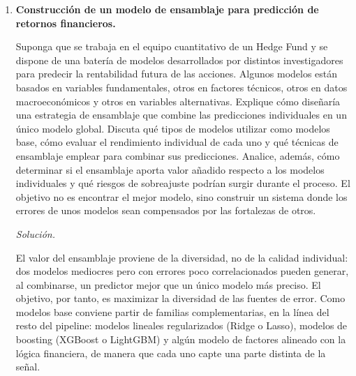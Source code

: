 \documentclass[12pt]{article}
\newcommand\sol[1]{\begin{mdframed}
\emph{Solución.} #1
\end{mdframed}}
\begin{document}
\begin{enumerate}
{\medskip
En cambio, construir variables a mano aporta poco cuando el propio modelo ya es capaz de extraer esa
información. Con imágenes, texto o audio, las redes neuronales profundas (como las redes
convolucionales) aprenden por sí solas qué conviene representar, y una transformación hecha a mano
(por ejemplo, un histograma de colores de una imagen) se queda corta frente a lo que aprende la red.
Tampoco compensa demasiado con conjuntos de datos grandes y de buena calidad, porque ahí los modelos
de boosting ya captan solos las interacciones y las relaciones no lineales. Y si el tiempo de
desarrollo es escaso, mantener y validar variables complicadas en producción puede costar más de lo
que aportan.
}

\item \textbf{Construcción de un modelo de ensamblaje para predicción de retornos financieros.}

Suponga que se trabaja en el equipo cuantitativo de un Hedge Fund y se dispone de una batería de
modelos desarrollados por distintos investigadores para predecir la rentabilidad futura de las
acciones. Algunos modelos están basados en variables fundamentales, otros en factores técnicos, otros
en datos macroeconómicos y otros en variables alternativas. Explique cómo diseñaría una estrategia
de ensamblaje que combine las predicciones individuales en un único modelo global. Discuta qué tipos
de modelos utilizar como modelos base, cómo evaluar el rendimiento individual de cada uno y qué
técnicas de ensamblaje emplear para combinar sus predicciones. Analice, además, cómo determinar si
el ensamblaje aporta valor añadido respecto a los modelos individuales y qué riesgos de sobreajuste
podrían surgir durante el proceso. El objetivo no es encontrar el mejor modelo, sino construir un
sistema donde los errores de unos modelos sean compensados por las fortalezas de otros.

\sol{

El valor del ensamblaje proviene de la diversidad, no de la calidad individual: dos modelos mediocres
pero con errores poco correlacionados pueden generar, al combinarse, un predictor mejor que un único
modelo más preciso. El objetivo, por tanto, es maximizar la diversidad de las fuentes de error. Como
modelos base conviene partir de familias complementarias, en la línea del resto del pipeline: modelos
lineales regularizados (Ridge o Lasso), modelos de boosting (XGBoost o LightGBM) y algún modelo de
factores alineado con la lógica financiera, de manera que cada uno capte una parte distinta de la
señal.

}
\end{enumerate}
\end{document}
